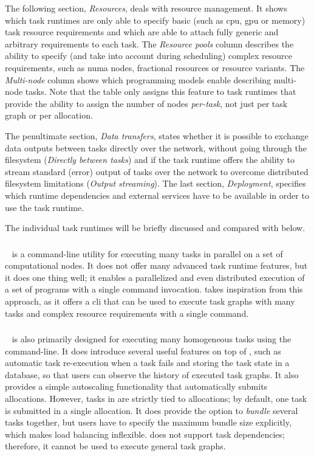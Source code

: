 The following section, \emph{Resources}, deals with resource management. It shows which task
runtimes are only able to specify basic (such as \gls{cpu}, \gls{gpu}
or memory) task resource requirements and which are able to attach fully generic and arbitrary
requirements to each task. The \emph{Resource pools} column describes the ability to specify (and
take into account during scheduling) complex resource requirements, such as \gls{numa}
nodes, fractional resources or resource variants. The \emph{Multi-node} column shows which
programming models enable describing multi-node tasks. Note that the table only assigns this
feature to task runtimes that provide the ability to assign the number of nodes
\emph{per-task}, not just per task graph or per allocation.

The penultimate section, \emph{Data transfers}, states whether it is possible to exchange data
outputs between tasks directly over the network, without going through the filesystem
(\emph{Directly between tasks}) and if the task runtime offers the ability to stream standard (error)
output of tasks over the network to overcome distributed filesystem limitations
(\emph{Output streaming}). The last section, \emph{Deployment}, specifies which runtime
dependencies and external services have to be available in order to use the task runtime.

The individual task runtimes will be briefly discussed and compared with \hyperqueue{}
below.

\subsubsection*{\gnuparallel}
\gnuparallel~\cite{parallel} is a command-line utility for executing many tasks in
parallel on a set of computational nodes. It does not offer many advanced task runtime features,
but it does one thing well; it enables a parallelized and even distributed execution of a set of
programs with a single command invocation. \hyperqueue{} takes inspiration from this
approach, as it offers a \gls{cli} that can be used to execute task graphs with many
tasks and complex resource requirements with a single command.

\subsubsection*{\hypershell}
\hypershell~\cite{hypershell} is also primarily designed for
executing many homogeneous tasks using the command-line. It does introduce several useful features
on top of \gnuparallel, such as automatic task re-execution when a task fails and storing the task
state in a database, so that users can observe the history of executed task graphs. It also
provides a simple autoscaling functionality that automatically submits allocations. However, tasks
in \hypershell are strictly tied to allocations; by default, one task is submitted in a single
allocation. It does provide the option to \emph{bundle} several tasks together, but users
have to specify the maximum bundle size explicitly, which makes load balancing inflexible.
\hypershell does not support task dependencies; therefore, it cannot be used to execute general
task graphs.

